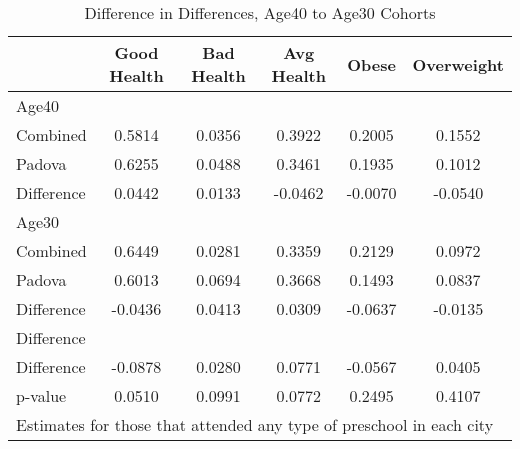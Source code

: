 \begin{table}[htbp]\centering
\caption{Difference in Differences, Age40 to Age30 Cohorts}
\begin{tabular}{l*{5}{c}}
\hline\hline
            & Good Health&  Bad Health&  Avg Health&       Obese&  Overweight\\
\hline
Age40       &            &            &            &            &            \\
Combined    &      0.5814&      0.0356&      0.3922&      0.2005&      0.1552\\
Padova      &      0.6255&      0.0488&      0.3461&      0.1935&      0.1012\\
Difference  &      0.0442&      0.0133&     -0.0462&     -0.0070&     -0.0540\\
\hline
Age30       &            &            &            &            &            \\
Combined    &      0.6449&      0.0281&      0.3359&      0.2129&      0.0972\\
Padova      &      0.6013&      0.0694&      0.3668&      0.1493&      0.0837\\
Difference  &     -0.0436&      0.0413&      0.0309&     -0.0637&     -0.0135\\
\hline
Difference  &            &            &            &            &            \\
Difference  &     -0.0878&      0.0280&      0.0771&     -0.0567&      0.0405\\
p-value     &      0.0510&      0.0991&      0.0772&      0.2495&      0.4107\\
\hline\hline
\multicolumn{6}{l}{\footnotesize Estimates for those that attended any type of preschool in each city}\\
\end{tabular}
\end{table}
